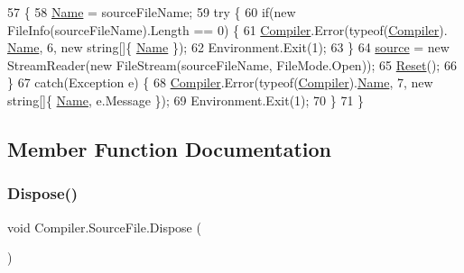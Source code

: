 \begin{DoxyCode}
57                                                              \{
58                         \mbox{\hyperlink{class_compiler_1_1_source_file_a0e304ca0e3d5b0af3dd18d09520f215e}{Name}} = sourceFileName;
59                         \textcolor{keywordflow}{try} \{
60                             \textcolor{keywordflow}{if}(\textcolor{keyword}{new} FileInfo(sourceFileName).Length == 0) \{
61                                 \mbox{\hyperlink{namespace_compiler}{Compiler}}.Error(typeof(\mbox{\hyperlink{namespace_compiler}{Compiler}}).
      \mbox{\hyperlink{class_compiler_1_1_source_file_a0e304ca0e3d5b0af3dd18d09520f215e}{Name}}, 6, \textcolor{keyword}{new} \textcolor{keywordtype}{string}[]\{ \mbox{\hyperlink{class_compiler_1_1_source_file_a0e304ca0e3d5b0af3dd18d09520f215e}{Name}} \});
62                                 Environment.Exit(1);
63                             \}
64                             \mbox{\hyperlink{class_compiler_1_1_source_file_a46db9fe024d4cf1e282e6afafea8c4b2}{source}} = \textcolor{keyword}{new} StreamReader(\textcolor{keyword}{new} FileStream(sourceFileName, FileMode.Open));
65                             \mbox{\hyperlink{class_compiler_1_1_source_file_aa64348e54dbb048b3ec58ce3d355e014}{Reset}}();
66                         \}
67                         \textcolor{keywordflow}{catch}(Exception e) \{
68                             \mbox{\hyperlink{namespace_compiler}{Compiler}}.Error(typeof(\mbox{\hyperlink{namespace_compiler}{Compiler}}).\mbox{\hyperlink{class_compiler_1_1_source_file_a0e304ca0e3d5b0af3dd18d09520f215e}{Name}}, 7, \textcolor{keyword}{new} \textcolor{keywordtype}{string}[]\{ 
      \mbox{\hyperlink{class_compiler_1_1_source_file_a0e304ca0e3d5b0af3dd18d09520f215e}{Name}}, e.Message \});
69                             Environment.Exit(1);
70                         \}
71                     \}
\end{DoxyCode}


\subsection{Member Function Documentation}
\mbox{\label{class_compiler_1_1_source_file_af5331d15e3c1a629af9cbd273c36c02c}} 
\subsubsection{\texorpdfstring{Dispose()}{Dispose()}\hspace{0.1cm}{\footnotesize\ttfamily [1/2]}}
{\footnotesize\ttfamily void Compiler.\+Source\+File.\+Dispose (\begin{DoxyParamCaption}{ }\end{DoxyParamCaption})}

